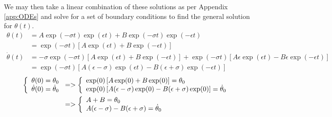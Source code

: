 \documentclass{article}
\begin{document}
We may then take a linear combination of these solutions as per Appendix \ref{app:ODEs} and solve for a set of boundary conditions to find the general solution for $\theta(t)$.
\begin{align*}
	\theta(t) &= A\exp(-\sigma t)\exp(\epsilon t) + B\exp(-\sigma t)\exp(-\epsilon t) \\
	&= \exp(-\sigma t)\left[A\exp(\epsilon t) + B\exp(-\epsilon t)\right] \\
	\dot{\theta}(t) &= -\sigma\exp(-\sigma t)\left[A\exp(\epsilon t) + B\exp(-\epsilon t)\right] + \exp(-\sigma t)\left[A\epsilon\exp(\epsilon t) - B\epsilon\exp(-\epsilon t)\right] \\
	&= \exp(-\sigma t)\left[A(\epsilon - \sigma)\exp(\epsilon t) - B(\epsilon + \sigma)\exp(-\epsilon t)\right]
\end{align*}
\begin{align*}
	\left\{
	\begin{array}{l l}
		\theta(0) = \theta_0 \\
		\dot{\theta}(0) = \dot{\theta}_0
	\end{array} \right.
	&=>
	\left\{
	\begin{array}{l l}
		\exp(0)\left[A\exp(0) + B\exp(0)\right] = \theta_0 \\
		\exp(0)\left[A(\epsilon - \sigma)\exp(0) - B(\epsilon + \sigma)\exp(0)\right] = \dot{\theta}_0
	\end{array} \right. \\
	& =>
	\left\{
	\begin{array}{l l}
		A + B = \theta_0 \\
		A(\epsilon - \sigma) - B(\epsilon + \sigma) = \dot{\theta}_0
	\end{array} \right.
\end{align*}
\end{document}
